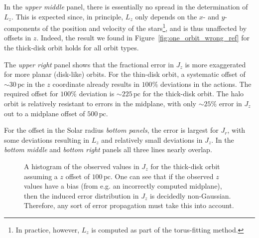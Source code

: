 \documentclass[twocolumn]{aastex62}
\newcommand{\pc}{\text{pc}}
\newcommand{\uth}{\textsuperscript{th}}
\begin{document}
In the {\em upper middle} panel, there is essentially no spread in the
determination of $L_z$. This is expected since, in principle, $L_z$ only
depends on the $x$- and $y$-components of the position and velocity of the
stars\footnote{In practice, however, $L_z$ is computed as part of the
torus-fitting method.}, and is thus unaffected by offsets in $z$. Indeed, the
result we found in Figure~\ref{fig:one_orbit_wrong_ref} for the thick-disk
orbit holds for all orbit types.
 
The {\em upper right} panel shows that the fractional error in $J_z$ is more
exaggerated for more planar (disk-like) orbits. For the thin-disk orbit, a
systematic offset of $\sim30\,\pc$ in the $z$ coordinate already results in
$100\%$ deviations in the actions. The required offset for $100\%$ deviation
is $\sim225\,\pc$ for the thick-disk orbit. The halo orbit is relatively
resistant to errors in the midplane, with only $\sim25\%$ error in $J_z$ out
to a midplane offset of $500\,\pc$.

For the offset in the Solar radius {\em bottom panels}, the error is largest
for $J_r$, with some deviations resulting in $L_z$ and relatively small
deviations in $J_z$. In the {\em bottom middle} and {\em bottom right} panels
all three lines nearly overlap.

\begin{figure*}
\caption{We report the 95\uth minus 5\uth percentile of the error in the
measured action ($\Delta J_i$) from coordinate system errors for the thin,
thick, and halo orbits (Table~\ref{tab:orbits}). The {\em left}, {\em center},
and {\em right} panels show the result for $J_r$, $L_z$, and $J_z$,
respectively. The {\em upper} panels consider an offset in $z$ and the {\em
lower} panels consider an offset in $x$ (equivalently, an offset in the Solar
radius).}
\label{fig:many_orbit_wrong_ref}
\end{figure*}

\begin{figure}
\caption{A histogram of the observed values in $J_z$ for the thick-disk orbit
assuming a $z$ offset of $100\,\pc$. One can see that if the observed $z$
values have a bias (from e.g. an incorrectly computed midplane), then the
induced error distribution in $J_z$ is decidedly non-Gaussian. Therefore, any
sort of error propagation must take this into account.}
\label{fig:Jz_hist}
\end{figure}
\end{document}
